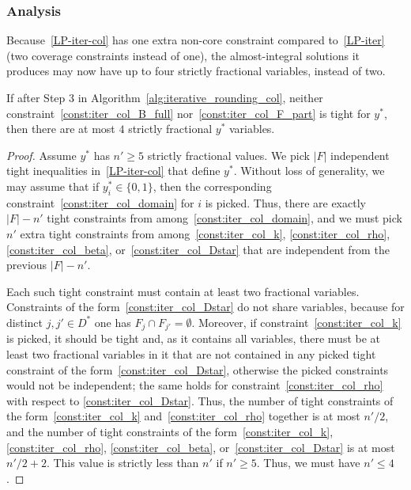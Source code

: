 \subsubsection{Analysis}

Because~\eqref{LP-iter-col} has one extra non-core constraint compared to~\eqref{LP-iter} (two coverage constraints instead of one), the almost-integral solutions it produces may now have up to four strictly fractional variables, instead of two.

\begin{lemma} \label{lem:iter_col_almost_integral}
If after Step 3 in {Algorithm~\ref{alg:iterative_rounding_col}}, neither constraint~\eqref{const:iter_col_B_full} nor~\eqref{const:iter_col_F_part} is tight for $y^*$, then there are at most $4$ strictly fractional $y^*$ variables.
\end{lemma}

\begin{proof}
Assume $y^*$ has $n' \ge 5$ strictly fractional values. We pick $|F|$ independent tight inequalities in~\eqref{LP-iter-col} that define $y^*$. Without loss of generality, we may assume that if $y^*_i \in \{0,1\}$, then the corresponding constraint~\eqref{const:iter_col_domain} for $i$ is picked. Thus, there are exactly $|F|-n'$ tight constraints from among~\eqref{const:iter_col_domain}, and we must pick $n'$ extra tight constraints from among~\eqref{const:iter_col_k}, \eqref{const:iter_col_rho}, \eqref{const:iter_col_beta}, or~\eqref{const:iter_col_Dstar} that are independent from the previous $|F|-n'$.

Each such tight constraint must contain at least two fractional variables. Constraints of the form~\eqref{const:iter_col_Dstar} do not share variables, because for distinct $j,j' \in D^*$ one has $F_j \cap F_{j'} = \emptyset$. Moreover, if constraint~\eqref{const:iter_col_k} is picked, it should be tight and, as it contains all variables, there must be at least two fractional variables in it that are not contained in any picked tight constraint of the form~\eqref{const:iter_col_Dstar}, otherwise the picked constraints would not be independent; the same holds for constraint~\eqref{const:iter_col_rho} with respect to \eqref{const:iter_col_Dstar}. Thus, the number of tight constraints of the form~\eqref{const:iter_col_k} and~\eqref{const:iter_col_rho} together is at most $n'/2$, and the number of tight constraints of the form~\eqref{const:iter_col_k}, \eqref{const:iter_col_rho}, \eqref{const:iter_col_beta}, or~\eqref{const:iter_col_Dstar} is at most $n'/2+2$. This value is strictly less than $n'$ if $n' \ge 5$. Thus, we must have $n' \le 4$.
\end{proof}

